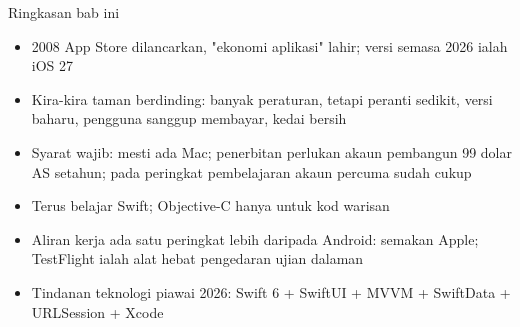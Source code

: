 \begin{tcbsummary}{Ringkasan bab ini}
\begin{itemize}
  \item 2008 App Store dilancarkan, "ekonomi aplikasi" lahir; versi semasa 2026 ialah iOS 27
  \item Kira-kira taman berdinding: banyak peraturan, tetapi peranti sedikit, versi baharu, pengguna sanggup membayar, kedai bersih
  \item Syarat wajib: mesti ada Mac; penerbitan perlukan akaun pembangun 99 dolar AS setahun; pada peringkat pembelajaran akaun percuma sudah cukup
  \item Terus belajar Swift; Objective-C hanya untuk kod warisan
  \item Aliran kerja ada satu peringkat lebih daripada Android: semakan Apple; TestFlight ialah alat hebat pengedaran ujian dalaman
  \item Tindanan teknologi piawai 2026: Swift 6 + SwiftUI + MVVM + SwiftData + URLSession + Xcode
\end{itemize}

\end{tcbsummary}
